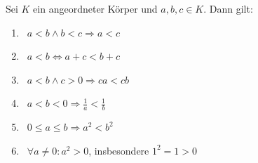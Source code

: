 Sei $K$ ein angeordneter Körper und $a, b, c \in K$. Dann gilt:
\begin{enumerate}[label="",leftmargin=0pt]
    \item {} \, $a < b \land b < c \Longrightarrow a < c$
    \item {} \, $a < b \Longleftrightarrow a + c < b + c$
    \item {} \, $a < b \land c > 0 \Longrightarrow ca < cb$
    \item {} \, $a < b < 0 \Longrightarrow \frac{1}{a} < \frac{1}{b}$
    \item {} \, $0 \leq a \leq b \Longrightarrow a^2 < b^2$
    \item {} \, $\forall a \neq 0 : a^2 > 0$, insbesondere $1^2 = 1 > 0$
\end{enumerate}